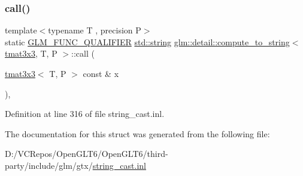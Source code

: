 \subsubsection{\texorpdfstring{call()}{call()}}
{\footnotesize\ttfamily template$<$typename T , precision P$>$ \\
static \mbox{\hyperlink{setup_8hpp_a33fdea6f91c5f834105f7415e2a64407}{G\+L\+M\+\_\+\+F\+U\+N\+C\+\_\+\+Q\+U\+A\+L\+I\+F\+I\+ER}} \mbox{\hyperlink{glad_8h_ac83513893df92266f79a515488701770}{std\+::string}} \mbox{\hyperlink{structglm_1_1detail_1_1compute__to__string}{glm\+::detail\+::compute\+\_\+to\+\_\+string}}$<$ \mbox{\hyperlink{structglm_1_1tmat3x3}{tmat3x3}}, T, P $>$\+::call (\begin{DoxyParamCaption}\item[{\mbox{\hyperlink{structglm_1_1tmat3x3}{tmat3x3}}$<$ T, P $>$ const \&}]{x }\end{DoxyParamCaption})\hspace{0.3cm}{\ttfamily [inline]}, {\ttfamily [static]}}



Definition at line 316 of file string\+\_\+cast.\+inl.



The documentation for this struct was generated from the following file\+:\begin{DoxyCompactItemize}
\item 
D\+:/\+V\+C\+Repos/\+Open\+G\+L\+T6/\+Open\+G\+L\+T6/third-\/party/include/glm/gtx/\mbox{\hyperlink{string__cast_8inl}{string\+\_\+cast.\+inl}}\end{DoxyCompactItemize}
